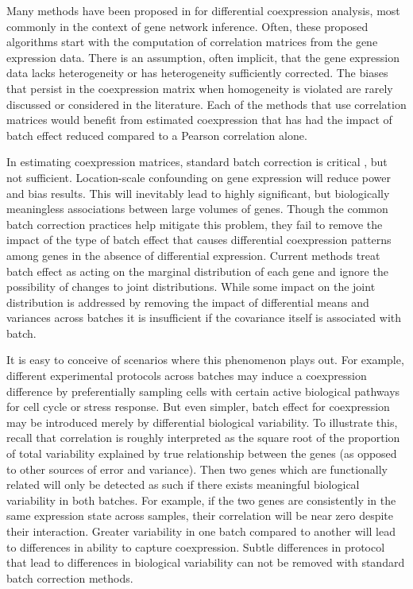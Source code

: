 Many methods have been proposed in for differential coexpression analysis,
most commonly in the context of gene network inference\cite{hsu2015functional}. Often, these
proposed algorithms start with the computation of correlation matrices
from the gene expression data\cite{tesson2010diffcoex,wgcna1,wgcna2,glass2013passing,southworth2009aging,choi2005differential,siska2017differential,yu2011link,amar2013dissection}.  
There is an assumption, often implicit, that the gene expression data
lacks heterogeneity or has heterogeneity sufficiently corrected. The
biases that persist in the coexpression matrix when homogeneity is
violated are rarely discussed or considered in the literature. Each
of the methods that use correlation matrices would benefit from estimated coexpression that has had the impact of batch effect reduced compared to
a Pearson correlation alone.

In estimating coexpression matrices, standard batch correction is
critical \cite{furlotte2011mixed}, but not sufficient. Location-scale
confounding on gene expression will reduce power and bias results.
This will inevitably lead to highly significant, but biologically
meaningless associations between large volumes of genes. Though the
common batch correction practices help mitigate this problem, they
fail to remove the impact of the type of batch effect that causes
differential coexpression patterns among genes in the absence of differential expression. Current methods treat
batch effect as acting on the marginal distribution of each gene and
ignore the possibility of changes to joint distributions. While some
impact on the joint distribution is addressed by removing the impact
of differential means and variances across batches it is insufficient
if the covariance itself is associated with batch. 

It is easy to conceive of scenarios where this phenomenon plays out.
For example, different experimental protocols across batches may induce
a coexpression difference by preferentially sampling cells with certain
active biological pathways for cell cycle or stress response. But
even simpler, batch effect for coexpression may be introduced merely
by differential biological variability. To illustrate this, recall
that correlation is roughly interpreted as the square root of the proportion
of total variability explained by true relationship between the genes (as opposed to other sources
of error and variance). Then two genes which are functionally related will only
be detected as such if there exists meaningful biological variability in both batches. For example, if the two genes are consistently in the same expression state across samples, their correlation will be near zero despite their interaction.  Greater variability in one batch compared to another will lead to differences in ability to capture coexpression. Subtle differences in protocol that lead to differences in
biological variability can not be removed with standard batch correction
methods.

